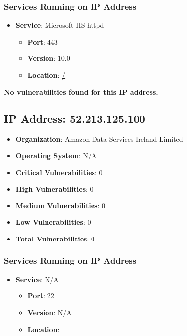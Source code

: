 \documentclass{article}
\begin{document}
\subsubsection*{Services Running on IP Address}

\begin{itemize}
    
        \item \textbf{Service}: Microsoft IIS httpd
        \begin{itemize}
            \item \textbf{Port}: 443
            \item \textbf{Version}:  10.0 
            \item \textbf{Location}: \href{ / }{ / }
        \end{itemize}
    
\end{itemize}


\textbf{No vulnerabilities found for this IP address.}




\clearpage



\subsection*{IP Address: 52.213.125.100}

\begin{itemize}
    \item \textbf{Organization}: Amazon Data Services Ireland Limited
    \item \textbf{Operating System}:  N/A 
    \item \textbf{Critical Vulnerabilities}: 0
    \item \textbf{High Vulnerabilities}: 0
    \item \textbf{Medium Vulnerabilities}: 0
    \item \textbf{Low Vulnerabilities}: 0
    \item \textbf{Total Vulnerabilities}: 0
\end{itemize}

\subsubsection*{Services Running on IP Address}

\begin{itemize}
    
        \item \textbf{Service}: N/A
        \begin{itemize}
            \item \textbf{Port}: 22
            \item \textbf{Version}:  N/A 
            \item \textbf{Location}: \href{  }{  }
        \end{itemize}
    
\end{itemize}
\end{document}
